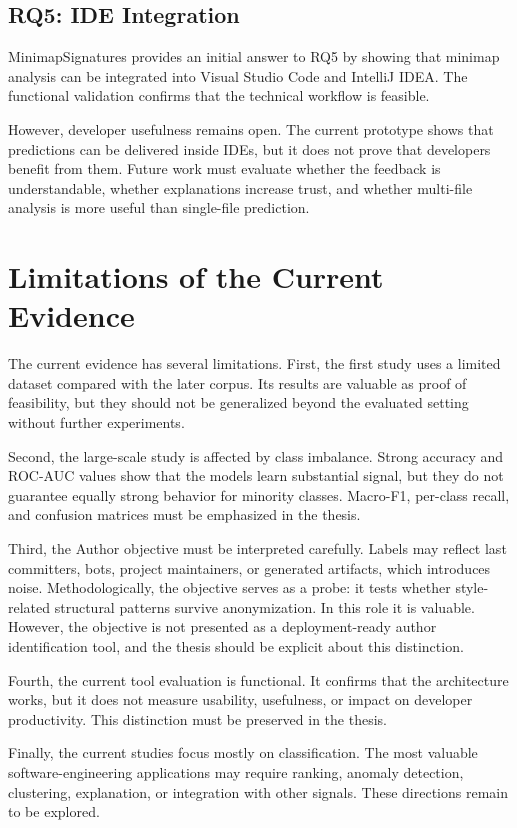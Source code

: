 \subsection{RQ5: IDE Integration}

MinimapSignatures provides an initial answer to RQ5 by showing that minimap
analysis can be integrated into Visual Studio Code and IntelliJ IDEA. The
functional validation confirms that the technical workflow is feasible.

However, developer usefulness remains open. The current prototype shows that
predictions can be delivered inside IDEs, but it does not prove that developers
benefit from them. Future work must evaluate whether the feedback is
understandable, whether explanations increase trust, and whether multi-file
analysis is more useful than single-file prediction.

\section{Limitations of the Current Evidence}

The current evidence has several limitations. First, the first study uses a
limited dataset compared with the later corpus. Its results are valuable as
proof of feasibility, but they should not be generalized beyond the evaluated
setting without further experiments.

Second, the large-scale study is affected by class imbalance. Strong accuracy
and ROC-AUC values show that the models learn substantial signal, but they do
not guarantee equally strong behavior for minority classes. Macro-F1, per-class
recall, and confusion matrices must be emphasized in the thesis.

Third, the Author objective must be interpreted carefully. Labels may reflect
last committers, bots, project maintainers, or generated artifacts, which
introduces noise. Methodologically, the objective serves as a probe: it tests
whether style-related structural patterns survive anonymization. In this role it
is valuable. However, the objective is not presented as a deployment-ready
author identification tool, and the thesis should be explicit about this
distinction.

Fourth, the current tool evaluation is functional. It confirms that the
architecture works, but it does not measure usability, usefulness, or impact on
developer productivity. This distinction must be preserved in the thesis.

Finally, the current studies focus mostly on classification. The most valuable
software-engineering applications may require ranking, anomaly detection,
clustering, explanation, or integration with other signals. These directions
remain to be explored.

